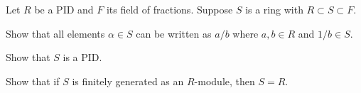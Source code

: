 Let $R$ be a PID and $F$ its field of fractions. Suppose $S$ is a ring
with $R\subset S\subset F$.
\begin{alist}
\item Show that all elements $\alpha\in S$ can be written as $a/b$
where $a,b\in R$ and $1/b\in S$.
\item Show that $S$ is a PID.
\item Show that if $S$ is finitely generated as an $R$-module, then
$S=R$.
\end{alist}
